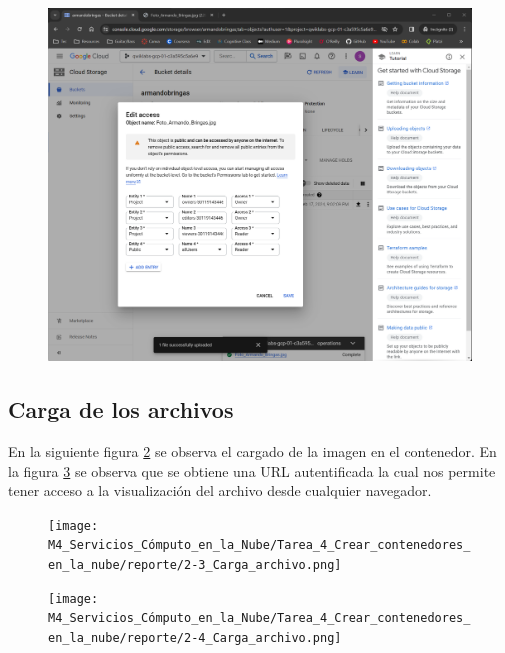 \documentclass[12pt,a4paper]{article}
\begin{document}
\begin{figure}[H]
    \centering
    \includegraphics[width=1\linewidth]{M4_Servicios_Cómputo_en_la_Nube/Tarea_4_Crear_contenedores_en_la_nube/reporte/2-2_Configuración_contenedor_público.png}
    \label{fig:Google_2}
\end{figure}

\vspace{5cm}

\subsection{Carga de los archivos}

En la siguiente figura \ref{fig:Google_3} se observa el cargado de la imagen en el contenedor. En la figura \ref{fig:Google_4} se observa que se obtiene una URL autentificada la cual nos permite tener acceso a la visualización del archivo desde cualquier navegador.

\begin{figure}[H]
    \centering
    \texttt{[image: M4\_Servicios\_Cómputo\_en\_la\_Nube/Tarea\_4\_Crear\_contenedores\_en\_la\_nube/reporte/2-3\_Carga\_archivo.png]}
    \label{fig:Google_3}
\end{figure}

\begin{figure}[H]
    \centering
    \texttt{[image: M4\_Servicios\_Cómputo\_en\_la\_Nube/Tarea\_4\_Crear\_contenedores\_en\_la\_nube/reporte/2-4\_Carga\_archivo.png]}
    \label{fig:Google_4}
\end{figure}
\end{document}
